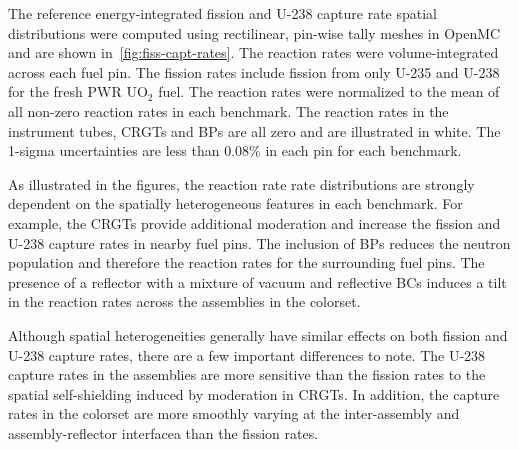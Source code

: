 The reference energy-integrated fission and U-238 capture rate spatial distributions were computed using rectilinear, pin-wise tally meshes in OpenMC and are shown in~\autoref{fig:fiss-capt-rates}. The reaction rates were volume-integrated across each fuel pin. The fission rates include fission from only U-235 and U-238 for the fresh PWR UO$_2$ fuel. The reaction rates were normalized to the mean of all non-zero reaction rates in each benchmark. The reaction rates in the instrument tubes, CRGTs and BPs are all zero and are illustrated in white. The 1-sigma uncertainties are less than 0.08\% in each pin for each benchmark.

As illustrated in the figures, the reaction rate rate distributions are strongly dependent on the spatially heterogeneous features in each benchmark. For example, the CRGTs provide additional moderation and increase the fission and U-238 capture rates in nearby fuel pins. The inclusion of BPs reduces the neutron population and therefore the reaction rates for the surrounding fuel pins. The presence of a reflector with a mixture of vacuum and reflective BCs induces a tilt in the reaction rates across the assemblies in the colorset.

Although spatial heterogeneities generally have similar effects on both fission and U-238 capture rates, there are a few important differences to note. The U-238 capture rates in the assemblies are more sensitive than the fission rates to the spatial self-shielding induced by moderation in CRGTs. In addition, the capture rates in the colorset are more smoothly varying at the inter-assembly and assembly-reflector interfacea than the fission rates.